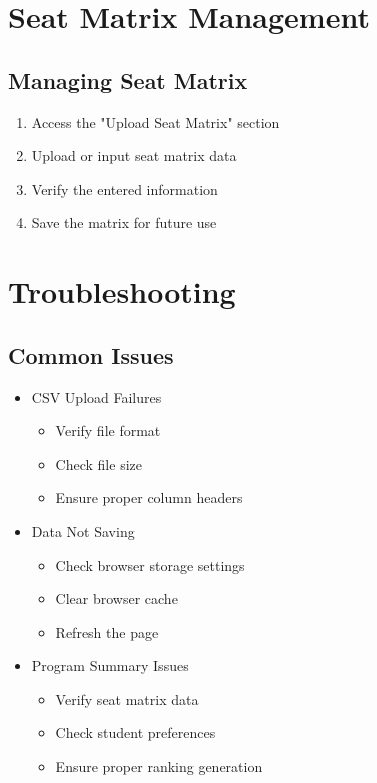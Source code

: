\documentclass[12pt,a4paper]{article}
\begin{document}
\section{Seat Matrix Management}
\subsection{Managing Seat Matrix}
\begin{enumerate}
    \item Access the "Upload Seat Matrix" section
    \item Upload or input seat matrix data
    \item Verify the entered information
    \item Save the matrix for future use
\end{enumerate}

\section{Troubleshooting}
\subsection{Common Issues}
\begin{itemize}
    \item CSV Upload Failures
    \begin{itemize}
        \item Verify file format
        \item Check file size
        \item Ensure proper column headers
    \end{itemize}
    \item Data Not Saving
    \begin{itemize}
        \item Check browser storage settings
        \item Clear browser cache
        \item Refresh the page
    \end{itemize}
    \item Program Summary Issues
    \begin{itemize}
        \item Verify seat matrix data
        \item Check student preferences
        \item Ensure proper ranking generation
    \end{itemize}
\end{itemize}
\end{document}
